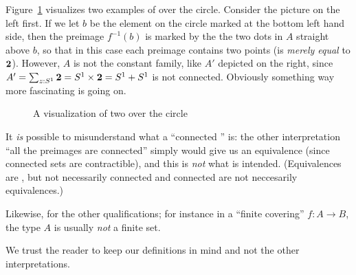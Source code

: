 Figure~\ref{fig:covering} visualizes two examples of \coverings over the circle.  
Consider the picture on the left first.  
If we let $b$ be the element on the circle marked at the bottom left hand side, then the preimage $f^{-1}(b)$ is marked by the the two dots in $A$ straight above $b$, 
so that in this case each preimage contains two points (is \emph{merely equal} to $\mathbf{2}$).  
However, $A$ is not the constant family, like $A'$ depicted on the right, since 
$A'=\sum_{z:{S^1}}\mathbf{2}={S^1}\times\mathbf{2}={S^1}+{S^1}$ is not connected.  
Obviously something way more fascinating is going on.
\begin{figure}[hbt]
  \centering
  \caption{A visualization of two \coverings over the circle}
  \label{fig:covering}
\end{figure}

\begin{remark}
  It \emph{is} possible to misunderstand what a ``connected \covering'' is: 
the other interpretation ``all the preimages are connected'' simply 
would give us an equivalence (since connected sets are contractible),
and this is \emph{not} what is intended. (Equivalences are \coverings, but not necessarily connected \coverings and connected \coverings are not neccesarily equivalences.)  

Likewise, for the other qualifications; for instance in a ``finite covering'' $f:A\to B$, the type $A$ is usually \emph{not} a finite set. 

  We trust the reader to keep our definitions in mind and not the other interpretations.
\end{remark}


